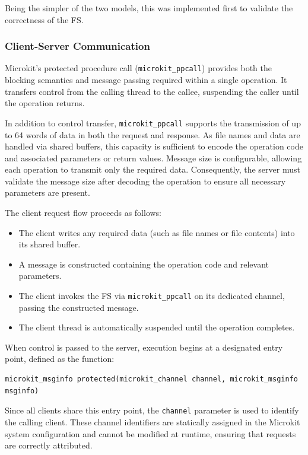 Being the simpler of the two models, this was implemented first to validate the correctness of the FS. 

\subsubsection{Client-Server Communication}

Microkit’s protected procedure call (\texttt{microkit\_ppcall}) provides both the blocking semantics and message passing required within a single operation. It transfers control from the calling thread to the callee, suspending the caller until the operation returns.

In addition to control transfer, \texttt{microkit\_ppcall} supports the transmission of up to 64 words of data in both the request and response. As file names and data are handled via shared buffers, this capacity is sufficient to encode the operation code and associated parameters or return values. Message size is configurable, allowing each operation to transmit only the required data. Consequently, the server must validate the message size after decoding the operation to ensure all necessary parameters are present. 

The client request flow proceeds as follows:
\begin{itemize}[itemsep=0.2ex, topsep=0.2ex]
    \item The client writes any required data (such as file names or file contents) into its shared buffer.
    \item A message is constructed containing the operation code and relevant parameters.
    \item The client invokes the FS via \texttt{microkit\_ppcall} on its dedicated channel, passing the constructed message.
    \item The client thread is automatically suspended until the operation completes.
\end{itemize}

When control is passed to the server, execution begins at a designated entry point, defined as the function:

\vspace{0.5cm}
\begin{lstlisting}[basicstyle=\fontsize{10.5}{10}\ttfamily\selectfont]
microkit_msginfo protected(microkit_channel channel, microkit_msginfo msginfo)
\end{lstlisting}

Since all clients share this entry point, the \texttt{channel} parameter is used to identify the calling client. These channel identifiers are statically assigned in the Microkit system configuration and cannot be modified at runtime, ensuring that requests are correctly attributed. 

